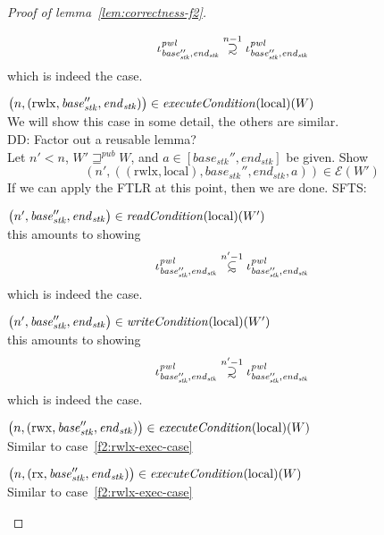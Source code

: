 \documentclass[a4paper]{article}
\newcommand\subsetsim{\mathrel{\ooalign{\raise.2ex\hbox{$\subset$}\cr
      \hidewidth\lower.8ex\hbox{\scalebox{0.9}{$\sim$}}\hidewidth\cr}}}
\newcommand\supsetsim{\mathrel{\ooalign{\raise.2ex\hbox{$\supset$}\cr
      \hidewidth\lower.8ex\hbox{\scalebox{0.9}{$\sim$}}\hidewidth\cr}}}
\newcommand{\nsubsim}[1][n]{\stackrel{\tiny{#1}}{\subsetsim}}
\newcommand{\nsupsim}[1][n]{\stackrel{\tiny{#1}}{\supsetsim}}
\newcommand\dominique[1]{{\color{purple} \sf \footnotesize {DD: #1}}\\}
\newcommand{\var}[1]{\mathit{#1}}
\newcommand{\start}{\var{base}}
\newcommand{\addrend}{\var{end}}
\newcommand{\stk}{\var{stk}}
\newcommand{\pwl}{\var{pwl}}
\newcommand{\plainfun}[2]{
  \ifthenelse{\equal{#2}{}}
  {\mathit{#1}}
  {\mathit{#1}(#2)}
}
\newcommand{\readCond}[1]{\plainfun{readCondition}{#1}}
\newcommand{\writeCond}[1]{\plainfun{writeCondition}{#1}}
\newcommand{\execCond}[1]{\plainfun{executeCondition}{#1}}
\newcommand{\futurewk}{\mathbin{\sqsupseteq}^{\var{pub}}}
\newcommand{\asmType}{\plaindom{AsmType}}
\newcommand{\plaindom}[1]{\mathrm{#1}}
\newcommand{\intr}[2]{\mathcal{#1}}
\newcommand{\exprintr}[1]{\intr{E}{#1}}
\newcommand{\stder}{\exprintr{\asmType}}
\newcommand{\npair}[2][n]{\left(#1,#2 \right)}
\newcommand{\plainperm}[1]{\mathrm{#1}}
\newcommand{\exec}{\plainperm{rx}}
\newcommand{\rwx}{\plainperm{rwx}}
\newcommand{\rwlx}{\plainperm{rwlx}}
\newcommand{\local}{\plainperm{local}}
\begin{document}
\begin{proof}[Proof of lemma~\ref{lem:correctness-f2}]
\begin{enumproof}[resume]
\begin{enumproof}
\begin{enumproof}
                      \[
                        \iota^\pwl_{\start_\stk'', \addrend_\stk} \nsupsim[n-1] \iota^\pwl_{\start_\stk'', \addrend_\stk}
                      \]
                      which is indeed the case.
                    \item $\npair{(\rwlx,\start_\stk'', \addrend_\stk)} \in \execCond{}(\local)(W)$ \label{f2:rwlx-exec-case} \\
                      We will show this case in some detail, the others are similar. \\
                      \dominique{Factor out a reusable lemma?}
                      Let $n' < n$, $W' \futurewk W$, and $a \in [\start_\stk'', \addrend_\stk]$ be given. Show
                      \[
                        \npair[n']{((\rwlx,\local),\start_\stk'', \addrend_\stk,a)} \in \stder(W')
                      \]
                      If we can apply the FTLR at this point, then we are done. SFTS:
                      \begin{enumproof}
                      \item $\npair[n']{\start_\stk'', \addrend_\stk} \in \readCond{}(\local)(W')$\\
                        this amounts to showing
                        \[
                          \iota^\pwl_{\start_\stk'', \addrend_\stk} \nsubsim[n'-1] \iota^\pwl_{\start_\stk'', \addrend_\stk}
                        \]
                        which is indeed the case.
                      \item $\npair[n']{\start_\stk'', \addrend_\stk} \in \writeCond{}(\local)(W')$ \\
                        this amounts to showing
                        \[
                          \iota^\pwl_{\start_\stk'', \addrend_\stk} \nsupsim[n'-1] \iota^\pwl_{\start_\stk'', \addrend_\stk}
                        \]
                        which is indeed the case.
                      \end{enumproof}
                    \item $\npair{(\rwx,\start_\stk'', \addrend_\stk)} \in \execCond{}(\local)(W)$\\
                      Similar to case~\ref{f2:rwlx-exec-case}
                    \item $\npair{(\exec,\start_\stk'', \addrend_\stk)} \in \execCond{}(\local)(W)$\\
                      Similar to case~\ref{f2:rwlx-exec-case}
                    \end{enumproof}

\end{enumproof}
\end{enumproof}
\end{proof}
\end{document}
